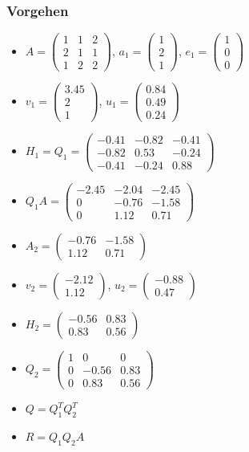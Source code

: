 \documentclass[6pt,a4paper]{scrartcl}
\begin{document}
\begin{multicols*}{4}
			\subsubsection{Vorgehen}
				\begin{itemize}\itemsep0pt	
					\item $A=\begin{pmatrix}1&1&2\\2&1&1\\1&2&2\end{pmatrix}$, $a_{1}=\begin{pmatrix}1\\2\\1\end{pmatrix}$, $e_{1}=\begin{pmatrix}1\\0\\0\end{pmatrix}$
					\item $v_{1} = \begin{pmatrix}3.45\\2\\1\end{pmatrix}$, $u_{1} = \begin{pmatrix}0.84\\0.49\\0.24\end{pmatrix}$
					\item $H_{1} = Q_{1} = \begin{pmatrix}-0.41&-0.82&-0.41\\-0.82&0.53&-0.24\\-0.41&-0.24&0.88\end{pmatrix}$
					\item $Q_{1}A= \begin{pmatrix}-2.45&-2.04&-2.45\\0&-0.76&-1.58\\0&1.12&0.71\end{pmatrix}$
					\item $ A_{2} = \begin{pmatrix}-0.76&-1.58\\1.12&0.71\end{pmatrix}$
					\item $v_{2} = \begin{pmatrix}-2.12\\1.12\end{pmatrix}$, $u_{2} = \begin{pmatrix}-0.88\\0.47\end{pmatrix}$
					\item $H_{2} = \begin{pmatrix}-0.56&0.83\\0.83&0.56\end{pmatrix}$
					\item $Q_{2} = \begin{pmatrix}1&0&0\\0&-0.56&0.83\\0&0.83&0.56\end{pmatrix}$
					\item $Q= Q_{1}^{T} Q_{2}^{T}$
					\item $R= Q_{1}Q_{2}A$
					

\end{itemize}
\end{multicols*}
\end{document}
